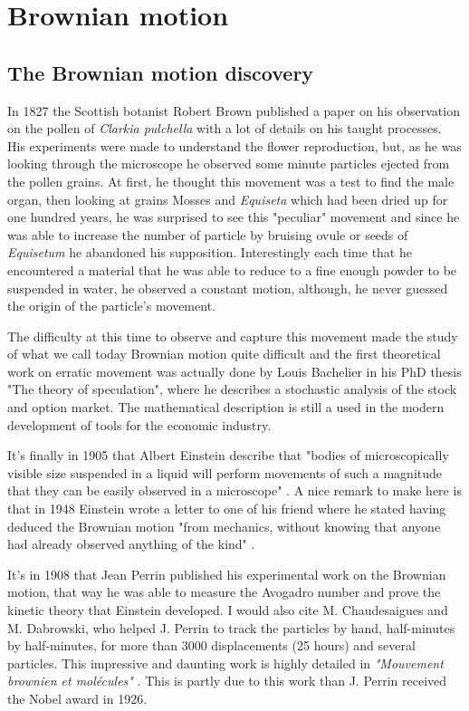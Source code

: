 \section{Brownian motion}
	\label{sec:chapter1}
	
\subsection{The Brownian motion discovery}


	
In 1827 the Scottish botanist Robert Brown published a paper \cite{robert_xxvii_1828} on his observation on the pollen of \textit{Clarkia pulchella} with a lot of details on his taught processes. His experiments were made to understand the flower reproduction, but, as he was looking through the microscope he observed some minute particles ejected from the pollen grains. At first, he thought this movement was a test to find the male organ, then looking at grains Mosses and \textit{Equiseta} which had been dried up for one hundred years, he was surprised to see this "peculiar" movement and since he was able to increase the number of particle by bruising ovule or seeds of \textit{Equisetum} he abandoned his supposition. Interestingly each time that he encountered a material that he was able to reduce to a fine enough powder to be suspended in water, he observed a constant motion, although, he never guessed the origin of the particle's movement.

The difficulty at this time to observe and capture this movement made the study of what we call today Brownian motion quite difficult and the first theoretical work on erratic movement was actually done by Louis Bachelier in his PhD thesis "The theory of speculation", where he describes a stochastic analysis of the stock and option market. The mathematical description is still a used in the modern development of tools for the economic industry. 

It's finally in 1905 that Albert Einstein describe that "bodies of microscopically visible size suspended in a liquid will perform movements of such a magnitude that they can be easily observed in a microscope" \cite{einstein_uber_1905}. A nice remark to make here is that in 1948 Einstein wrote a letter to one of his friend where he stated having deduced the Brownian motion "from mechanics, without knowing that anyone had already observed anything of the kind" \cite{peter_brownian_nodate}.

It's in 1908 that Jean Perrin published his experimental work on the Brownian motion, that way he was able to measure the Avogadro number and prove the kinetic theory that Einstein developed. I would also cite M. Chaudesaigues and M. Dabrowski, who helped J. Perrin to track the particles by hand, half-minutes by half-minutes, for more than 3000 displacements (25 hours) and several particles. This impressive and daunting work is highly detailed in \textit{"Mouvement brownien et molécules"} \cite{perrin_mouvement_1910}. This is partly due to this work than J. Perrin received the Nobel award in 1926.

